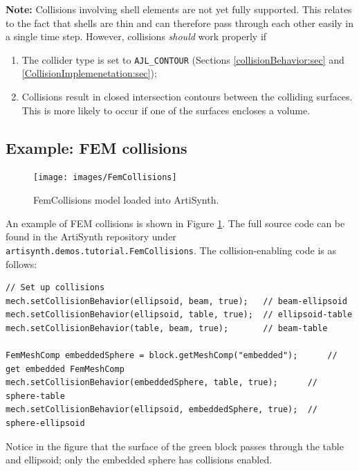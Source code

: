 \begin{sideblock}
{\bf Note:} Collisions involving shell elements are not yet fully
supported.  This relates to the fact that shells are thin and can
therefore pass through each other easily in a single time step.
However, collisions {\it should} work properly if

\begin{enumerate}

\item The collider type is set to {\tt AJL\_CONTOUR} (Sections
\ref{collisionBehavior:sec} and \ref{CollisionImplemenetation:sec});

\item Collisions result in closed intersection contours between
the colliding surfaces. This is more likely to occur if one of the
surfaces encloses a volume.

\end{enumerate}

\end{sideblock}

\subsection{Example: FEM collisions}

\begin{figure}[ht]
	\centering
	\texttt{[image: images/FemCollisions]}
	\caption{FemCollisions model loaded into ArtiSynth.}
	\label{fig:fem:collisions}
\end{figure}

An example of FEM collisions is shown in Figure \ref{fig:fem:collisions}.
The full source code can be found in the ArtiSynth repository under
{\tt artisynth.demos.tutorial.FemCollisions}.  The collision-enabling
code is as follows:
\begin{lstlisting}[]
// Set up collisions
mech.setCollisionBehavior(ellipsoid, beam, true);   // beam-ellipsoid
mech.setCollisionBehavior(ellipsoid, table, true);  // ellipsoid-table
mech.setCollisionBehavior(table, beam, true);       // beam-table

FemMeshComp embeddedSphere = block.getMeshComp("embedded");      // get embedded FemMeshComp
mech.setCollisionBehavior(embeddedSphere, table, true);      // sphere-table
mech.setCollisionBehavior(ellipsoid, embeddedSphere, true);  // sphere-ellipsoid   
\end{lstlisting}
Notice in the figure that the surface of the green block passes through
the table and ellipsoid; only the embedded sphere has collisions enabled.

